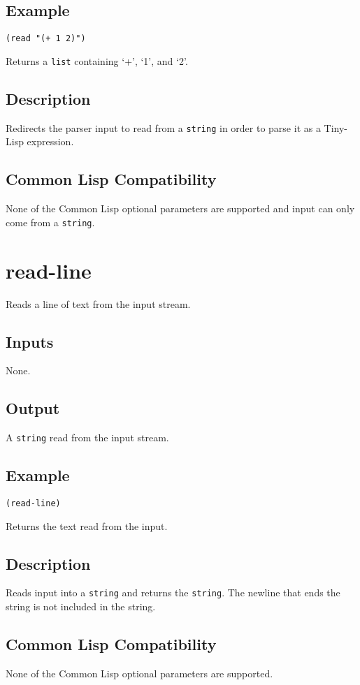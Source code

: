 \documentclass[10pt, openany]{book}
\newcommand{\datatype}[1]{\texttt{#1}}
\newcommand{\tl}{Tiny-Lisp}
\newcommand{\cl}{Common Lisp}
\begin{document}
\subsection{Example}
\begin{lstlisting}
(read "(+ 1 2)")
\end{lstlisting}
Returns a \datatype{list} containing `+', `1', and `2'.
\subsection{Description}
Redirects the parser input to read from a \datatype{string} in order to parse it as a \tl{} expression.
\subsection{Common Lisp Compatibility}
None of the \cl{} optional parameters are supported and input can only come from a \datatype{string}.

\section{read-line}
Reads a line of text from the input stream.
\subsection{Inputs}
None.
\subsection{Output}
A \datatype{string} read from the input stream.
\subsection{Example}
\begin{lstlisting}
(read-line)
\end{lstlisting}
Returns the text read from the input.
\subsection{Description}
Reads input into a \datatype{string} and returns the \datatype{string}.  The newline that ends the string is not included in the string.
\subsection{Common Lisp Compatibility}
None of the \cl{} optional parameters are supported.
\end{document}

